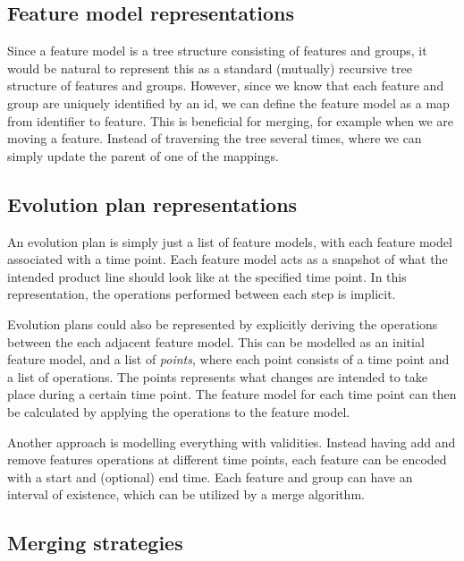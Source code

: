 \documentclass[a4paper,english]{ifimaster}
\begin{document}
\subsection{Feature model representations}%
\label{sub:feature_model_representations}

Since a feature model is a tree structure consisting of features and groups, it would be natural to represent this as a standard (mutually) recursive tree structure of features and groups. However, since we know that each feature and group are uniquely identified by an id, we can define the feature model as a map from identifier to feature. This is beneficial for merging, for example when we are moving a feature. Instead of traversing the tree several times, where we can simply update the parent of one of the mappings.

\subsection{Evolution plan representations}%
\label{sub:evolution_plan_representations}

An evolution plan is simply just a list of feature models, with each feature model associated with a time point. Each feature model acts as a snapshot of what the intended product line should look like at the specified time point. In this representation, the operations performed between each step is implicit.

Evolution plans could also be represented by explicitly deriving the operations between the each adjacent feature model. This can be modelled as an initial feature model, and a list of \textit{points}, where each point consists of a time point and a list of operations. The points represents what changes are intended to take place during a certain time point. The feature model for each time point can then be calculated by applying the operations to the feature model.

Another approach is modelling everything with validities. Instead having add and remove features operations at different time points, each feature can be encoded with a start and (optional) end time. Each feature and group can have an interval of existence, which can be utilized by a merge algorithm.

\subsection{Merging strategies}%
\label{sub:merging_strategies}
\end{document}
